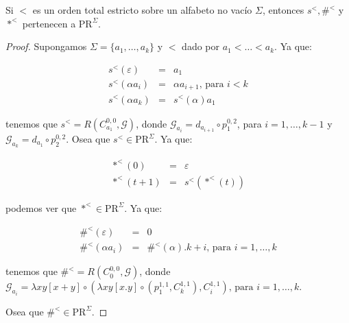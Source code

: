   \begin{lemma}
    \par Si $<$ es un orden total estricto sobre un alfabeto no vacío $\Sigma$, entonces $s^{<}, \#^{<}$ y $\ast^{<}$
    pertenecen a $\mathrm{PR}^{\Sigma}$.
  \end{lemma}
  \begin{proof}
    \par Supongamos $\Sigma = \{a_{1}, \dotsc, a_{k}\}$ y $<$ dado por $a_{1} < \dotsc < a_{k}$. Ya que:

    \begin{eqnarray}
      \nonumber s^{<}(\varepsilon) &=& a_{1} \\
      \nonumber s^{<}(\alpha a_{i}) &=& \alpha a_{i+1} \text{, para } i < k \\
      \nonumber s^{<}(\alpha a_{k}) &=& s^{<}(\alpha) a_{1}
    \end{eqnarray}

    \par tenemos que $s^{<} = R(C_{a_{1}}^{0, 0}, \mathcal{G})$, donde $\mathcal{G}_{a_{i}} = d_{a_{i+1}} \circ
    p_{1}^{0, 2}$, para $i = 1, \dotsc, k-1$ y $\mathcal{G}_{a_{k}} = d_{a_{1}} \circ p_{2}^{0,2}.$ Osea que $s^{<} \in
    \mathrm{PR}^{\Sigma}$. Ya que:

    \begin{eqnarray}
      \nonumber \ast^{<}(0) &=& \varepsilon \\
      \nonumber \ast^{<}(t+1) &=& s^{<}(\ast^{<}(t))
    \end{eqnarray}

    \par podemos ver que $\ast^{<} \in \mathrm{PR}^{\Sigma}$. Ya que:

    \begin{eqnarray}
      \nonumber \#^{<}(\varepsilon) &=& 0 \\
      \nonumber \#^{<}(\alpha a_{i}) &=& \#^{<}(\alpha). k + i \text{, para } i = 1, \dotsc, k
    \end{eqnarray}

    \par tenemos que $\#^{<} = R(C_{0}^{0, 0}, \mathcal{G})$, donde $\mathcal{G}_{a_{i}} = \lambda xy \left[x+y\right]
    \circ (\lambda xy \left[x.y\right] \circ (p_{1}^{1, 1}, C_{k}^{1, 1}), C_{i}^{1, 1})
    \text{, para } i = 1, \dotsc, k$.

    \par Osea que $\#^{<} \in \mathrm{PR}^{\Sigma}$.
  \end{proof}

